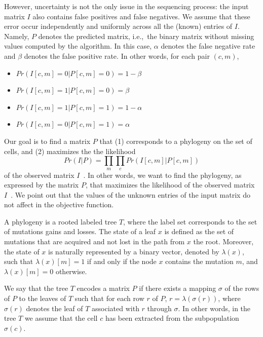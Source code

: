 \documentclass[a4paper,USenglish]{article}
\newcommand{\ie}{i.e.,~}
\theoremstyle{definition}
\begin{document}
However, uncertainty is not the only issue in the sequencing process:
the input matrix $I$ also contains false positives and false negatives. 
We assume that these error occur independently and uniformly across 
all the (known) entries of $I$. 
Namely, $P$ denotes the predicted matrix, \ie the binary matrix without
missing values computed by the algorithm.
In this case,
$\alpha$ denotes the false negative rate and $\beta$ denotes the false positive rate.
In other words, for each pair $(c,m)$, 
\begin{itemize}
    \item $Pr(I[c,m] = 0|P[c,m] = 0) = 1- \beta$
    \item $Pr(I[c,m] = 1|P[c,m] = 0) = \beta$
    \item $Pr(I[c,m] = 1|P[c,m] = 1) = 1- \alpha$
    \item $Pr(I[c,m] = 0|P[c,m] = 1) = \alpha$
\end{itemize}

Our goal is to find a matrix $P$ that (1) corresponds to a phylogeny on the set of cells,
and (2) maximizes the the likelihood 
$$
Pr(I|P) = \prod_{m} \prod_{c} Pr(I[c,m] | P[c,m])
$$
of the observed matrix $I$~\cite{Jahn2016}.
In other words, we want to find the phylogeny, as expressed by the matrix $P$, that
maximizes the likelihood of the observed matrix $I$~\cite{Jahn2016}.
We point out that the values of the unknown entries of the input matrix 
do not affect in the objective function.


A phylogeny is a rooted labeled tree $T$, where the label set corresponds to the set of
mutations gains and losses.
The state of a leaf $x$ is defined as the set of mutations that are acquired and not lost in the path from $x$ the root.
Moreover, the state of $x$ is naturally
represented by a binary vector, denoted by $\lambda(x)$, such that $\lambda(x)[m]=1$ if and
only if the node $x$ contains the mutation $m$, and $\lambda(x)[m]=0$ otherwise.

We say that the tree $T$ encodes a matrix $P$ 
if there exists a mapping $\sigma$ of the rows  of $P$
to the leaves of $T$ such that for each row $r$ of $P$, $r=\lambda(\sigma(r))$,
where $\sigma(r)$ denotes the leaf of $T$ associated with $r$ through $\sigma$.
In other words, in the tree $T$ we assume that the cell $c$ has been extracted from the
subpopulation $\sigma(c)$.
\end{document}
